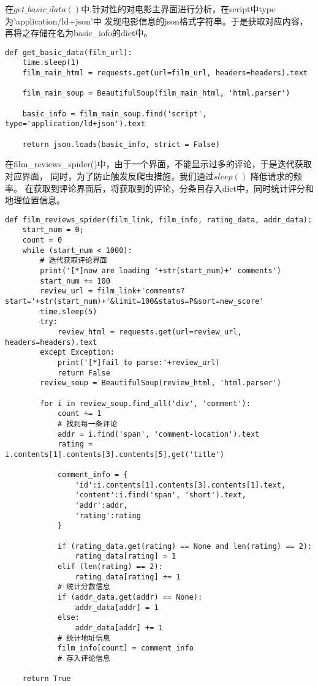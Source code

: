 \documentclass[12pt]{article}
\begin{document}
在$get\_basic\_data()$中,针对性的对电影主界面进行分析，在script中type为'application/ld+json'中
发现电影信息的json格式字符串。于是获取对应内容，再将之存储在名为basic\_iofo的dict中。

\lstset{language=Python}
\begin{lstlisting}
def get_basic_data(film_url):
    time.sleep(1)
    film_main_html = requests.get(url=film_url, headers=headers).text
    
    film_main_soup = BeautifulSoup(film_main_html, 'html.parser')

    basic_info = film_main_soup.find('script', type='application/ld+json').text
    
    return json.loads(basic_info, strict = False)
\end{lstlisting}

在film\_reviews\_spider()中，由于一个界面，不能显示过多的评论，于是迭代获取对应界面，
同时，为了防止触发反爬虫措施，我们通过$sleep()$ 降低请求的频率。
在获取到评论界面后，将获取到的评论，分条目存入dict中，同时统计评分和地理位置信息。


\lstset{language=Python}
\begin{lstlisting}
def film_reviews_spider(film_link, film_info, rating_data, addr_data):
    start_num = 0;
    count = 0
    while (start_num < 1000):
        # 迭代获取评论界面
        print('[*]now are loading '+str(start_num)+' comments')
        start_num += 100
        review_url = film_link+'comments?start='+str(start_num)+'&limit=100&status=P&sort=new_score'
        time.sleep(5)
        try:
            review_html = requests.get(url=review_url, headers=headers).text
        except Exception:
            print('[*]fail to parse:'+review_url)
            return False
        review_soup = BeautifulSoup(review_html, 'html.parser')

        for i in review_soup.find_all('div', 'comment'):
            count += 1
            # 找到每一条评论
            addr = i.find('span', 'comment-location').text
            rating = i.contents[1].contents[3].contents[5].get('title')

            comment_info = {
                'id':i.contents[1].contents[3].contents[1].text,
                'content':i.find('span', 'short').text,
                'addr':addr,
                'rating':rating
            }

            if (rating_data.get(rating) == None and len(rating) == 2):
                rating_data[rating] = 1
            elif (len(rating) == 2):
                rating_data[rating] += 1
            # 统计分数信息
            if (addr_data.get(addr) == None):
                addr_data[addr] = 1
            else:
                addr_data[addr] += 1
            # 统计地址信息
            film_info[count] = comment_info
            # 存入评论信息

    return True
\end{lstlisting}
\end{document}
